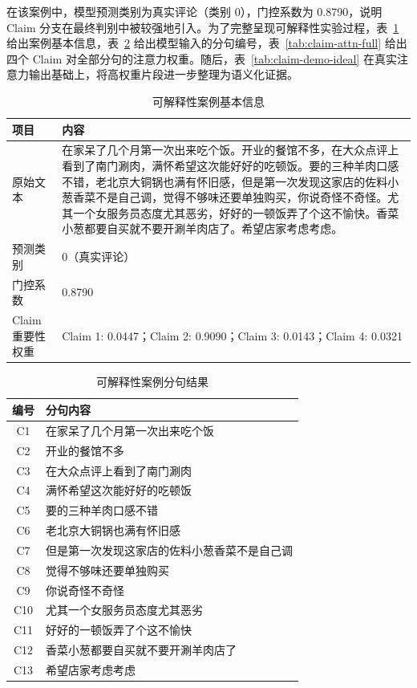 \documentclass[UTF8,oneside,openright,fontset=none]{ctexbook}
\numberwithin{equation}{chapter}
\begin{document}
在该案例中，模型预测类别为真实评论（类别 0），门控系数为 0.8790，说明 Claim 分支在最终判别中被较强地引入。为了完整呈现可解释性实验过程，表~\ref{tab:claim-case-info} 给出案例基本信息，表~\ref{tab:claim-clause-list} 给出模型输入的分句编号，表~\ref{tab:claim-attn-full} 给出四个 Claim 对全部分句的注意力权重。随后，表~\ref{tab:claim-demo-ideal} 在真实注意力输出基础上，将高权重片段进一步整理为语义化证据。

\begin{table}[htbp]
  \centering
  \small
  \caption{可解释性案例基本信息}
  \label{tab:claim-case-info}
  \begin{tabularx}{\textwidth}{lX}
    \toprule
    项目 & 内容 \\
    \midrule
    原始文本 & 在家呆了几个月第一次出来吃个饭。开业的餐馆不多，在大众点评上看到了南门涮肉，满怀希望这次能好好的吃顿饭。要的三种羊肉口感不错，老北京大铜锅也满有怀旧感，但是第一次发现这家店的佐料小葱香菜不是自己调，觉得不够味还要单独购买，你说奇怪不奇怪。尤其一个女服务员态度尤其恶劣，好好的一顿饭弄了个这不愉快。香菜小葱都要自买就不要开涮羊肉店了。希望店家考虑考虑。 \\
    预测类别 & 0（真实评论） \\
    门控系数 & 0.8790 \\
    Claim 重要性权重 & Claim 1: 0.0447；Claim 2: 0.9090；Claim 3: 0.0143；Claim 4: 0.0321 \\
    \bottomrule
  \end{tabularx}
\end{table}

\begin{table}[htbp]
  \centering
  \small
  \caption{可解释性案例分句结果}
  \label{tab:claim-clause-list}
  \begin{tabularx}{\textwidth}{cX}
    \toprule
    编号 & 分句内容 \\
    \midrule
    C1 & 在家呆了几个月第一次出来吃个饭 \\
    C2 & 开业的餐馆不多 \\
    C3 & 在大众点评上看到了南门涮肉 \\
    C4 & 满怀希望这次能好好的吃顿饭 \\
    C5 & 要的三种羊肉口感不错 \\
    C6 & 老北京大铜锅也满有怀旧感 \\
    C7 & 但是第一次发现这家店的佐料小葱香菜不是自己调 \\
    C8 & 觉得不够味还要单独购买 \\
    C9 & 你说奇怪不奇怪 \\
    C10 & 尤其一个女服务员态度尤其恶劣 \\
    C11 & 好好的一顿饭弄了个这不愉快 \\
    C12 & 香菜小葱都要自买就不要开涮羊肉店了 \\
    C13 & 希望店家考虑考虑 \\
    \bottomrule
  \end{tabularx}
\end{table}
\end{document}
